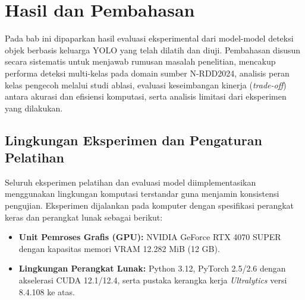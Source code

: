 \chapter{Hasil dan Pembahasan}
\label{chap:hasil_pembahasan}

Pada bab ini dipaparkan hasil evaluasi eksperimental dari model-model deteksi objek berbasis keluarga YOLO yang telah dilatih dan diuji. Pembahasan disusun secara sistematis untuk menjawab rumusan masalah penelitian, mencakup performa deteksi multi-kelas pada domain sumber N-RDD2024, analisis peran kelas pengecoh melalui studi ablasi, evaluasi keseimbangan kinerja (\textit{trade-off}) antara akurasi dan efisiensi komputasi, serta analisis limitasi dari eksperimen yang dilakukan.

\section{Lingkungan Eksperimen dan Pengaturan Pelatihan}
\label{sec:lingkungan_eksperimen}

Seluruh eksperimen pelatihan dan evaluasi model diimplementasikan menggunakan lingkungan komputasi terstandar guna menjamin konsistensi pengujian. Eksperimen dijalankan pada komputer dengan spesifikasi perangkat keras dan perangkat lunak sebagai berikut:
\begin{itemize}
	\item \textbf{Unit Pemroses Grafis (GPU):} NVIDIA GeForce RTX 4070 SUPER dengan kapasitas memori VRAM 12.282 MiB (12 GB).
	\item \textbf{Lingkungan Perangkat Lunak:} Python 3.12, PyTorch 2.5/2.6 dengan akselerasi CUDA 12.1/12.4, serta pustaka kerangka kerja \textit{Ultralytics} versi 8.4.108 ke atas.
\end{itemize}

